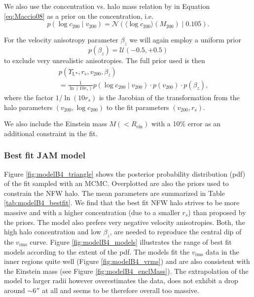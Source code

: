 \documentclass[useAMS,usenatbib]{mnras}
\newcommand{\OLD}[1]{}
\begin{document}
We also use the concentration vs. halo mass relation by \citet{Maccio08} in Equation \eqref{eq:Maccio08} as a prior on the concentration, i.e.
\begin{equation}
p(\log c_{200} \mid v_{200}) = \mathscr{N}\left(\langle \log c_{200} \rangle (M_{200}) \mid 0.105 \right). \label{eq:prior_c200}
\end{equation}

For the velocity anisotropy parameter $\beta_z$ we will again employ a uniform prior 
\begin{equation*}
p(\beta_z) = \mathscr{U}(-0.5,+0.5)
\end{equation*}
to exclude very unrealistic anisotropies. The full prior used is then
\begin{eqnarray*}
&&p(\Upsilon_\text{I,*},r_s,v_{200},\beta_z) \\
&&= \frac{1}{\ln\left( 10 r_s\right)} p(\log c_{200} \mid v_{200}) \cdot p(v_{200}) \cdot p(\beta_z), 
\end{eqnarray*}
where the factor $1/\ln\left( 10 r_s\right)$ is the Jacobian of the transformation from the halo parameters $(v_{200},\log c_{200})$ to the fit parameters $(v_{200},r_s)$.

\OLD{We restrict the $v_\text{rms}$ fit to a region $R' \lesssim 3.5''$, approximately within the effective half-light radius $R_\text{eff} = 2.6''$. }We also include the Einstein mass $M(<R_\text{ein})$ with a 10\% error as an additional constraint in the fit.

\subsubsection{Best fit JAM model} \label{sec:results_JAM_NFW_results}

Figure \ref{fig:modelB4_triangle} shows the posterior probability distribution (pdf) of the fit sampled with an MCMC. Overplotted are also the priors used to constrain the NFW halo. The mean parameters are summarized in Table \ref{tab:modelB4_bestfit}. We find that the best fit NFW halo strives to be more massive and with a higher concentration (due to a smaller $r_s$) than  proposed by the priors. The model also prefers  very negative velocity anisotropies. Both, the high halo concentration and low $\beta_z$, are needed to reproduce the central dip of the $v_\text{rms}$ curve. Figure \ref{fig:modelB4_models} illustrates the range of best fit models according to the extent of the pdf. The models fit the $v_\text{rms}$ data in the inner regions quite well (Figure \ref{fig:modelB4_vrms}) and are also consistent with the Einstein mass (see Figure \ref{fig:modelB4_enclMass}). The extrapolation of the model to larger radii however overestimates the data, does not exhibit a drop around $\sim 6''$ at all and seems to be therefore overall too massive.
\end{document}
